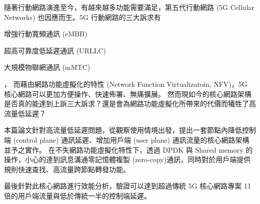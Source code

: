 \begin{abstractzh}

    隨著行動網路演進至今，有越來越多功能需要滿足，第五代行動網路 (5G Cellular Networks) 也因應而生。5G 行動網路的三大訴求有
    \begin{enumerate*}
    \item 增強行動寬頻通訊 (eMBB)
    \item 超高可靠度低延遲通訊 (URLLC)
    \item 大規模物聯網通訊 (mMTC)
    \end{enumerate*}，
    而藉由網路功能虛擬化的特性 (Network Function Virtualizatoin, NFV)，5G 核心網路可以更加方便操作、快速佈署、無痛擴展。
    然而現如今的核心網路架構是否真的能達到上訴三大訴求？還是會為網路功能虛擬化所帶來的代價而犧牲了高流量低延遲？

    本篇論文針對高流量低延遲問題，從觀察使用情境出發，提出一套節點內降低控制端 (control plane) 通訊延遲、增加用戶端 (user plane) 通訊流量的核心網路架構並予之實作。
    在不失網路功能虛擬化特性下，透過 DPDK 與 Shared memory 的操作，小心的達到訊息溝通零記憶體複製 (zero-copy)通訊，同時對於用戶端提供規則快速查找、高流量跨節點轉發功能。

    最後針對此核心網路進行效能分析，驗證可以達到超過傳統 5G 核心網路專案 11 倍的用戶端流量與低於傳統一半的控制端延遲。

\end{abstractzh}


